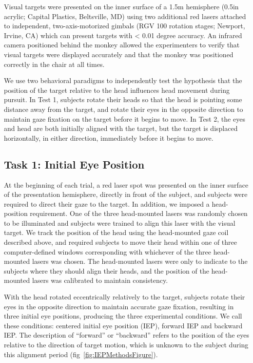 \documentclass[12pt]{article}
\begin{document}
Visual targets were presented on the inner surface of a 1.5m hemisphere (0.5in acrylic; Capital Plastics, Beltsville, MD) using two additional red lasers attached to independent, two-axis-motorized gimbals (RGV 100 rotation stages; Newport, Irvine, CA) which can present targets with < 0.01 degree accuracy. An infrared camera positioned behind the monkey allowed the experimenters to verify that visual targets were displayed accurately and that the monkey was positioned correctly in the chair at all times. 

We use two behavioral paradigms to independently test the hypothesis that the position of the target relative to the head influences head movement during pursuit. In Test 1, subjects rotate their heads so that the head is pointing some distance away from the target, and rotate their eyes in the opposite direction to maintain gaze fixation on the target before it begins to move. In Test 2, the eyes and head are both initially aligned with the target, but the target is displaced horizontally, in either direction, immediately before it begins to move.

\subsection{Task 1: Initial Eye Position} 
At the beginning of each trial, a red laser spot was presented on the inner surface of the presentation hemisphere, directly in front of the subject, and subjects were required to direct their gaze to the target. In addition, we imposed a head-position requirement. One of the three head-mounted lasers was randomly chosen to be illuminated and subjects were trained to align this laser with the visual target. We track the position of the head using the head-mounted gaze coil described above, and required subjects to move their head within one of three computer-defined windows corresponding with whichever of the three head-mounted lasers was chosen. The head-mounted lasers were only to indicate to the subjects where they should align their heads, and the position of the head-mounted lasers was calibrated to maintain consistency.

With the head rotated eccentrically relatively to the target, subjects rotate their eyes in the opposite direction to maintain accurate gaze fixation, resulting in three initial eye positions, producing the three experimental conditions. We call these conditions: centered initial eye position (IEP), forward IEP and backward IEP. The description of “forward” or “backward” refers to the position of the eyes relative to the direction of target motion, which is unknown to the subject during this alignment period (fig~\ref{fig:IEPMethodsFigure}).
\end{document}
